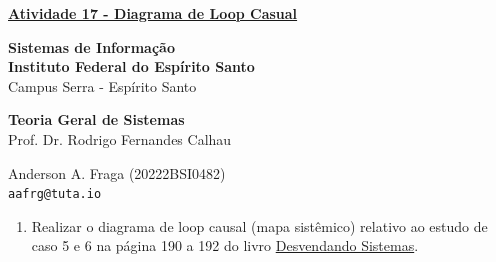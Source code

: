 \documentclass[11pt]{article}
\begin{document}
\underline{\textbf{Atividade 17 - Diagrama de Loop Casual}}\par
\textbf{Sistemas de Informação}\\
\textbf{Instituto Federal do Espírito Santo}\\
Campus Serra - Espírito Santo\par
\textbf{Teoria Geral de Sistemas}\\
Prof. Dr. Rodrigo Fernandes Calhau\par
Anderson A. Fraga (20222BSI0482)\\
\texttt{aafrg@tuta.io}\\  %

\begin{enumerate}
    \item Realizar o diagrama de loop causal (mapa sistêmico) relativo ao estudo de caso 5 e 6 na página 190 a 192 do livro \href{https://drive.google.com/file/d/1eJU2qK8IzC-S8jRKQuHrIgED1tEvzGOq/view}{Desvendando Sistemas}.


\end{enumerate}
\end{document}
